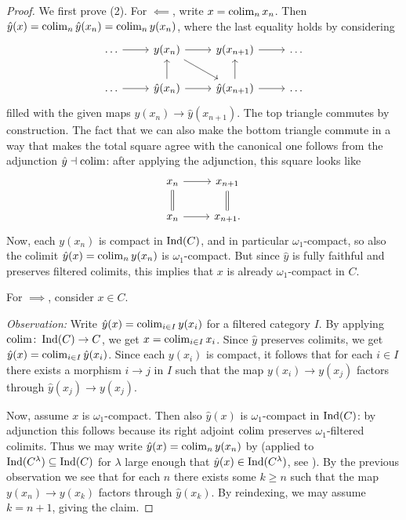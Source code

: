 	\begin{proof}
		We first prove (2). For $\impliedby$, write $x = \operatorname{colim}_n x_n$. Then $\hat{y}(x) = \operatorname{colim}_n \hat{y}(x_n) = \operatorname{colim}_n y(x_n)$, where the last equality holds by considering
		\[
			\begin{tikzcd}
				\dots \rar & y(x_n) \rar \arrow[dr] & y(x_{n+1}) \rar & \dots \\
				\dots \rar & \hat{y}(x_n) \rar \uar & \hat{y}(x_{n+1}) \rar \uar & \dots
			\end{tikzcd}
		\]
		filled with the given maps $y(x_n) \to \hat{y}(x_{n+1})$. The top triangle commutes by construction. The fact that we can also make the bottom triangle commute in a way that makes the total square agree with the canonical one follows from the adjunction $\hat{y} \dashv \operatorname{colim}$: after applying the adjunction, this square looks like
		\[
			\begin{tikzcd}
				x_n \rar \dar[equals] & x_{n+1} \dar[equals] \\
				x_n \rar & x_{n+1}.
			\end{tikzcd}
		\]
		Now, each $y(x_n)$ is compact in $\operatorname{Ind}(C)$, and in particular $\omega_1$-compact, so also the colimit $\hat{y}(x) = \operatorname{colim}_n y(x_n)$ is $\omega_1$-compact. But since $\hat{y}$ is fully faithful and preserves filtered colimits, this implies that $x$ is already $\omega_1$-compact in $C$.

		For $\implies$, consider $x \in C$.

		\emph{Observation:} Write $\hat{y}(x) = \operatorname{colim}_{i \in I} y(x_i)$ for a filtered category $I$. By applying $\operatorname{colim}\colon \operatorname{Ind}(C) \to C$, we get $x = \operatorname{colim}_{i \in I} x_i$. Since $\hat{y}$ preserves colimits, we get $\hat{y}(x) = \operatorname{colim}_{i \in I} \hat{y}(x_i)$. Since each $y(x_i)$ is compact, it follows that for each $i \in I$ there exists a morphism $i \to j$ in $I$ such that the map $y(x_i) \to y(x_j)$ factors through $\hat{y}(x_j) \to y(x_j)$.

		Now, assume $x$ is $\omega_1$-compact. Then also $\hat{y}(x)$ is $\omega_1$-compact in $\operatorname{Ind}(C)$: by adjunction this follows because its right adjoint $\operatorname{colim}$ preserves $\omega_1$-filtered colimits. Thus we may write $\hat{y}(x) = \operatorname{colim}_n y(x_n)$ by  (applied to $\operatorname{Ind}(C^{\lambda}) \subseteq \operatorname{Ind}(C)$ for $\lambda$ large enough that $\hat{y}(x) \in \operatorname{Ind}(C^{\lambda})$, see ). By the previous observation we see that for each $n$ there exists some $k \geq n$ such that the map $y(x_n) \to y(x_k)$ factors through $\hat{y}(x_k)$. By reindexing, we may assume $k = n+1$, giving the claim.


\end{proof}

